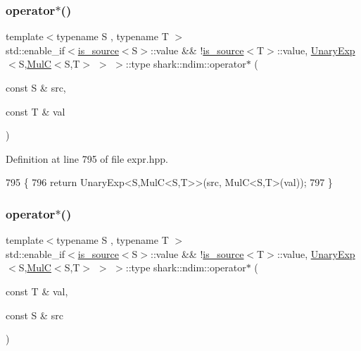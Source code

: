 \subsubsection{\texorpdfstring{operator$\ast$()}{operator*()}\hspace{0.1cm}{\footnotesize\ttfamily [4/6]}}
{\footnotesize\ttfamily template$<$typename S , typename T $>$ \\
std\+::enable\+\_\+if$<$\hyperlink{classshark_1_1ndim_1_1is__source}{is\+\_\+source}$<$S$>$\+::value \&\& !\hyperlink{classshark_1_1ndim_1_1is__source}{is\+\_\+source}$<$T$>$\+::value, \hyperlink{classshark_1_1ndim_1_1_unary_exp}{Unary\+Exp}$<$S,\hyperlink{classshark_1_1ndim_1_1_mul_c}{MulC}$<$S,T$>$ $>$ $>$\+::type shark\+::ndim\+::operator$\ast$ (\begin{DoxyParamCaption}\item[{const S \&}]{src,  }\item[{const T \&}]{val }\end{DoxyParamCaption})}



Definition at line 795 of file expr.\+hpp.


\begin{DoxyCode}
795                                                                                                            
                                   \{
796             \textcolor{keywordflow}{return} UnaryExp<S,MulC<S,T>>(src, MulC<S,T>(val));
797         \}
\end{DoxyCode}
\hypertarget{namespaceshark_1_1ndim_a87b233d59888fe2949738606ff57d3f9}{}\label{namespaceshark_1_1ndim_a87b233d59888fe2949738606ff57d3f9} 
\subsubsection{\texorpdfstring{operator$\ast$()}{operator*()}\hspace{0.1cm}{\footnotesize\ttfamily [5/6]}}
{\footnotesize\ttfamily template$<$typename S , typename T $>$ \\
std\+::enable\+\_\+if$<$\hyperlink{classshark_1_1ndim_1_1is__source}{is\+\_\+source}$<$S$>$\+::value \&\& !\hyperlink{classshark_1_1ndim_1_1is__source}{is\+\_\+source}$<$T$>$\+::value, \hyperlink{classshark_1_1ndim_1_1_unary_exp}{Unary\+Exp}$<$S,\hyperlink{classshark_1_1ndim_1_1_mul_c}{MulC}$<$S,T$>$ $>$ $>$\+::type shark\+::ndim\+::operator$\ast$ (\begin{DoxyParamCaption}\item[{const T \&}]{val,  }\item[{const S \&}]{src }\end{DoxyParamCaption})}



